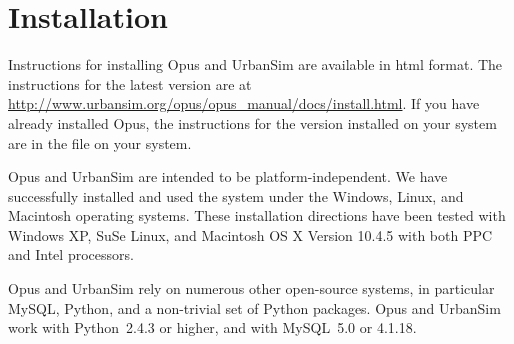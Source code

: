 

\chapter{Installation}
\label{chapter:installation}


Instructions for installing Opus and UrbanSim are available in html
format.  The instructions for the latest version are at
\url{http://www.urbansim.org/opus/opus_manual/docs/install.html}.
If you have already installed Opus, the instructions for the version
installed on your system are in the
 file on your system.

Opus and UrbanSim are intended to be platform-independent.
 We have successfully installed and used the
system under the Windows, \windowsindex Linux, \linuxindex and Macintosh
\macintoshindex operating systems. These installation directions have been
tested with Windows XP, \windowstestindex SuSe Linux, \suseindex
\linuxtestindex and Macintosh OS X Version 10.4.5 \macintoshtestindex with both
PPC  and Intel \intelindex{} processors.

Opus and UrbanSim rely on numerous other open-source systems, in particular
MySQL, Python, and a non-trivial set of Python packages.  Opus and UrbanSim
work with Python~2.4.3 or higher, \pythonversionindex and with
MySQL~5.0 or 4.1.18.\mysqlversionindex


